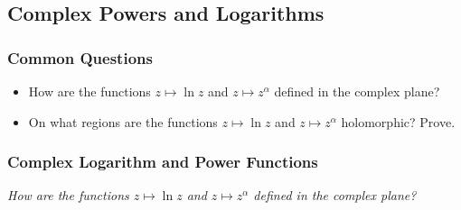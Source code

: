 \documentclass[11pt, a4paper]{article}
\newcommand{\question}[1]{\textit{#1}\vspace{2mm}}
\begin{document}
\subsection{Complex Powers and Logarithms}
\subsubsection{Common Questions}
\begin{itemize}
	\item How are the functions $ z \mapsto \ln z $ and $ z \mapsto z^{\alpha} $ defined in the complex plane?
	
	\item On what regions are the functions $ z \mapsto \ln z $ and $ z \mapsto z^{\alpha} $ holomorphic? Prove.
\end{itemize}

\subsubsection{Complex Logarithm and Power Functions}
\question{How are the functions $ z \mapsto \ln z $ and $ z \mapsto z^{\alpha} $ defined in the complex plane?}
\end{document}
